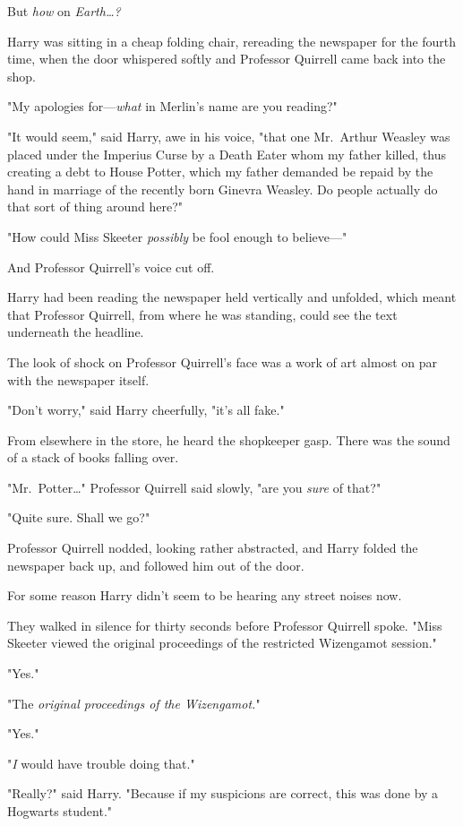 But \emph{how} on \emph{Earth{\ldots}?}

Harry was sitting in a cheap folding chair, rereading the newspaper for the
fourth time, when the door whispered softly and Professor Quirrell came back
into the shop.

"My apologies for---\emph{what} in Merlin's name are you reading?"

"It would seem," said Harry, awe in his voice, "that one Mr.~Arthur Weasley was
placed under the Imperius Curse by a Death Eater whom my father killed, thus
creating a debt to House Potter, which my father demanded be repaid by the hand
in marriage of the recently born Ginevra Weasley. Do people actually do that
sort of thing around here?"

"How could Miss Skeeter \emph{possibly} be fool enough to believe---"

And Professor Quirrell's voice cut off.

Harry had been reading the newspaper held vertically and unfolded, which meant
that Professor Quirrell, from where he was standing, could see the text
underneath the headline.

The look of shock on Professor Quirrell's face was a work of art almost on par
with the newspaper itself.

"Don't worry," said Harry cheerfully, "it's all fake."

From elsewhere in the store, he heard the shopkeeper gasp. There was the sound
of a stack of books falling over.

"Mr.~Potter{\ldots}" Professor Quirrell said slowly, "are you \emph{sure} of
that?"

"Quite sure. Shall we go?"

Professor Quirrell nodded, looking rather abstracted, and Harry folded the
newspaper back up, and followed him out of the door.

For some reason Harry didn't seem to be hearing any street noises now.

They walked in silence for thirty seconds before Professor Quirrell spoke.
"Miss Skeeter viewed the original proceedings of the restricted Wizengamot
session."

"Yes."

"The \emph{original proceedings of the Wizengamot.}"

"Yes."

"\emph{I} would have trouble doing that."

"Really?" said Harry. "Because if my suspicions are correct, this was done by a
Hogwarts student."

